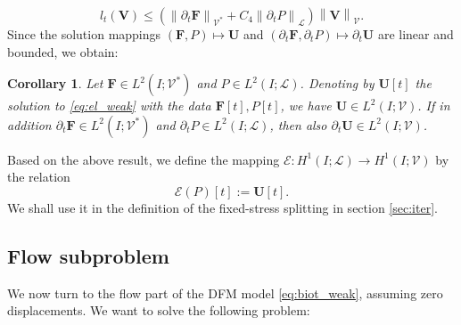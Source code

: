 \documentclass[a4paper]{article}
\newtheorem{corollary}[theorem]{Corollary}
\numberwithin{equation}{section}
\def\dt{\prtl_t}
\def\FF{\vc F}
\def\Hf{\mathscr{L}} %
\def\norm#1{\left\|#1\right\|}
\def\prtl{\partial}
\def\U{\vc U}
\def\V{\vc V}
\def\Vel{{\boldsymbol{\mathcal V}}} %
\def\vc#1{\mathbf{#1}}     %
\newcommand{\eqs}[1]{\begin{equation*}#1\end{equation*}}
\begin{document}
\eqs{ l_t(\V) \le \left(\norm{\dt\FF}_{\Vel^*} + C_4\norm{\dt P}_\Hf\right)\norm{\V}_\Vel. }
Since the solution mappings $(\FF,P) \mapsto \U$ and $(\dt\FF,\dt P)\mapsto\dt\U$ are linear and bounded, we obtain:
\begin{corollary}
Let $\FF\in L^2( I;\Vel^*)$ and $P\in L^2( I;\Hf)$.
Denoting by $\U[t]$ the solution to \eqref{eq:el_weak} with the data $\FF[t],P[t]$, we have $\U\in L^2( I;\Vel)$.
If in addition $\dt\FF\in L^2( I;\Vel^*)$ and $\dt P\in L^2( I;\Hf)$, then also $\dt\U\in L^2( I;\Vel)$.
\end{corollary}
% 
Based on the above result, we define the mapping $\mathcal E: H^1( I;\Hf)\to H^1( I;\Vel)$ by the relation
\eqs{ \mathcal E(P)[t] := \U[t]. }
We shall use it in the definition of the fixed-stress splitting in section \ref{sec:iter}.


\subsection{Flow subproblem}\label{sec:wellposedness_flow}

We now turn to the flow part of the DFM model \eqref{eq:biot_weak}, assuming zero displacements.
We want to solve the following problem:
\end{document}

